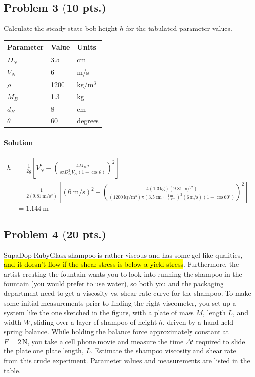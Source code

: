 \documentclass[12pt]{article}
\begin{document}
\subsection*{Problem 3 (10 pts.)}
Calculate the steady state bob height $h$ for the tabulated parameter values.

\begin{center}
\begin{tabular}{lll}
\toprule
Parameter & Value & Units \\
\midrule
$D_N$ & 3.5 & cm \\
$V_N$ & 6 & m/s \\
$\rho$ & 1200 & kg/m$^3$ \\
$M_B$ & 1.3 & kg \\
$d_B$ & 8 & cm \\
$\theta$ & 60 & degrees \\
\bottomrule
\end{tabular}
\end{center}

\paragraph{Solution}\mbox{}
\[
\begin{aligned}
h&=\frac{1}{2g}\left[
V_N^2-\left(
\frac{4M_Bg}{\rho\pi D_N^2V_N(1-\cos\theta)}
\right)^2\right]\\
&=\frac{1}{2(\SI{9.81}{\meter\per\second\squared})}
\left[
(\SI{6}{\meter\per\second})^2-
\left(
\frac{
4(\SI{1.3}{\kilogram})(\SI{9.81}{\meter\per\second\squared})
}{
(\SI{1200}{\kilogram\per\meter\cubed})
\pi\left(\SI{3.5}{\centi\meter}\cdot
\frac{\SI{1}{\meter}}{\SI{100}{\centi\meter}}\right)^2
(\SI{6}{\meter\per\second})(1-\cos60^\circ)
}
\right)^2
\right]\\
&=\boxed{\SI{1.144}{\meter}}
\end{aligned}
\]



\subsection*{Problem 4 (20 pts.)}
SupaDop RubyGlasz shampoo is rather viscous and has some gel-like qualities, \hl{and it doesn't flow if the shear stress is below a yield stress}. Furthermore, the artist creating the fountain wants you to look into running the shampoo in the fountain (you would prefer to use water), so both you and the packaging department need to get a viscosity vs. shear rate curve for the shampoo. To make some initial measurements prior to finding the right viscometer, you set up a system like the one sketched in the figure, with a plate of mass $M$, length $L$, and width $W$, sliding over a layer of shampoo of height $h$, driven by a hand-held spring balance. While holding the balance force approximately constant at $F=2\,\mathrm{N}$, you take a cell phone movie and measure the time $\Delta t$ required to slide the plate one plate length, $L$. Estimate the shampoo viscosity and shear rate from this crude experiment. Parameter values and measurements are listed in the table.
\end{document}
